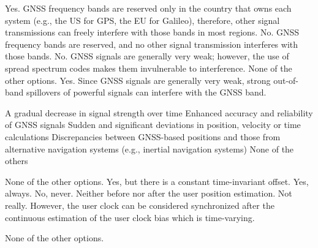 
\begin{checkboxes}
    \choice Yes. GNSS frequency bands are reserved only in the country that owns each system (e.g., the US for GPS, the EU for Galileo), therefore, other signal transmissions can freely interfere with those bands in most regions.
    \choice No. GNSS frequency bands are reserved, and no other signal transmission interferes with those bands.
    \choice No. GNSS signals are generally very weak; however, the use of spread spectrum codes makes them invulnerable to interference.
    \choice None of the other options.
    \CorrectChoice Yes. Since GNSS signals are generally very weak, strong out-of-band spillovers of powerful signals can interfere with the GNSS band.
\end{checkboxes}

\begin{checkboxes}
    \choice A gradual decrease in signal strength over time
    \choice Enhanced accuracy and reliability of GNSS signals
    \CorrectChoice Sudden and significant deviations in position, velocity or time calculations
    \CorrectChoice Discrepancies between GNSS-based positions and those from alternative navigation systems (e.g., inertial navigation systems)
    \choice None of the others
\end{checkboxes}


\begin{checkboxes}
    \choice None of the other options.
    \choice Yes, but there is a constant time-invariant offset.
    \choice Yes, always.
    \choice No, never. Neither before nor after the user position estimation.
    \CorrectChoice Not really. However, the user clock can be considered synchronized after the
    continuous estimation of the user clock bias which is time-varying.
\end{checkboxes}

\begin{checkboxes}
    \choice None of the other options.
\end{checkboxes}


